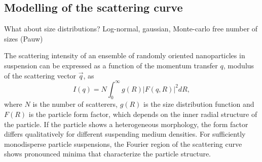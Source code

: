 \subsection{Modelling of the scattering curve}
What about size distributions? Log-normal, gaussian, Monte-carlo free number of sizes (Pauw)

The scattering intensity of an ensemble of randomly oriented nanoparticles in suspension can be expressed as a function of the momentum transfer \( q \), modulus of the scattering vector \(\vec q\), as
\begin{equation}
\label{eq:intensity}
I(q)=N\int_{0}^{\infty} g(R)\left|F(q,R) \right|^2 dR,
\end{equation}
where \(N\) is the number of scatterers, \(g(R)\) is the size distribution function and \(F(R)\) is the particle form factor, which depends on the inner radial structure of the particle. If the particle shows a heterogeneous morphology, the form factor differs qualitatively for different suspending medium densities.  For sufficiently monodisperse particle suspensions, the Fourier region of the scattering curve shows pronounced minima that characterize the particle structure. 

